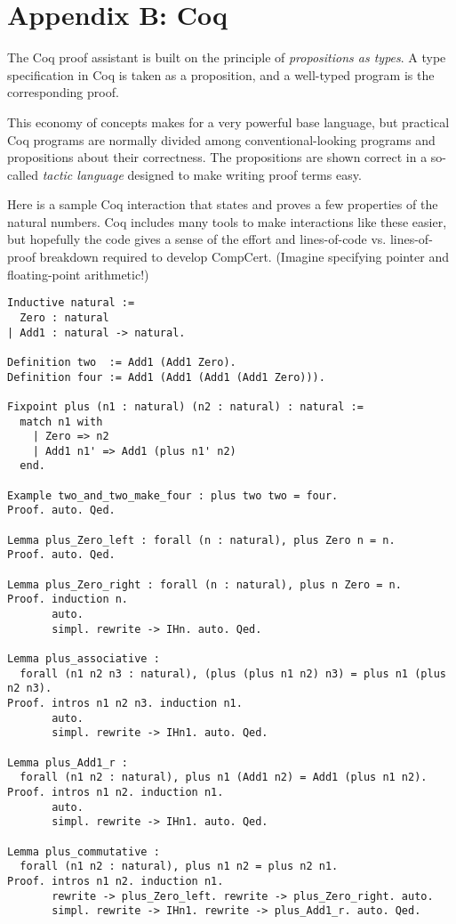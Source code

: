 \section*{Appendix B: Coq}
\label{sec:coq}

The Coq proof assistant is built on the principle of \emph{propositions as types}.
A type specification in Coq is taken as a proposition, and a well-typed program is the corresponding proof.

This economy of concepts makes for a very powerful base language, but practical Coq programs are normally divided among conventional-looking programs and propositions about their correctness.
The propositions are shown correct in a so-called \emph{tactic language} designed to make writing proof terms easy.

Here is a sample Coq interaction that states and proves a few properties of the natural numbers.
Coq includes many tools to make interactions like these easier, but hopefully the code gives a sense of the effort and lines-of-code vs. lines-of-proof breakdown required to develop CompCert.
(Imagine specifying pointer and floating-point arithmetic!)

\begin{lstlisting}[style=Coq]
Inductive natural :=
  Zero : natural
| Add1 : natural -> natural.

Definition two  := Add1 (Add1 Zero).
Definition four := Add1 (Add1 (Add1 (Add1 Zero))).

Fixpoint plus (n1 : natural) (n2 : natural) : natural :=
  match n1 with
    | Zero => n2
    | Add1 n1' => Add1 (plus n1' n2)
  end.

Example two_and_two_make_four : plus two two = four.
Proof. auto. Qed.

Lemma plus_Zero_left : forall (n : natural), plus Zero n = n.
Proof. auto. Qed.

Lemma plus_Zero_right : forall (n : natural), plus n Zero = n.
Proof. induction n.
       auto.
       simpl. rewrite -> IHn. auto. Qed.

Lemma plus_associative :
  forall (n1 n2 n3 : natural), (plus (plus n1 n2) n3) = plus n1 (plus n2 n3).
Proof. intros n1 n2 n3. induction n1.
       auto.
       simpl. rewrite -> IHn1. auto. Qed.

Lemma plus_Add1_r :
  forall (n1 n2 : natural), plus n1 (Add1 n2) = Add1 (plus n1 n2).
Proof. intros n1 n2. induction n1.
       auto.
       simpl. rewrite -> IHn1. auto. Qed.

Lemma plus_commutative :
  forall (n1 n2 : natural), plus n1 n2 = plus n2 n1.
Proof. intros n1 n2. induction n1.
       rewrite -> plus_Zero_left. rewrite -> plus_Zero_right. auto.
       simpl. rewrite -> IHn1. rewrite -> plus_Add1_r. auto. Qed.
\end{lstlisting}
